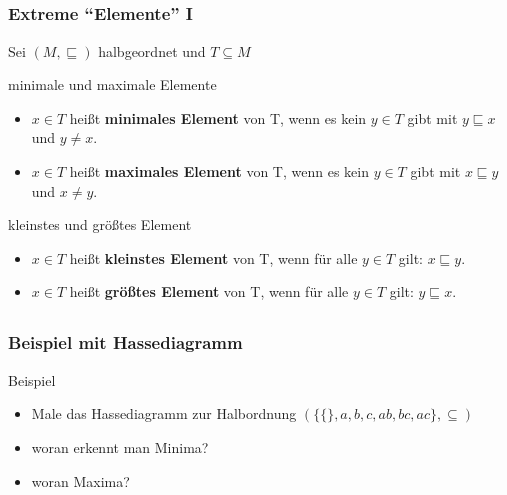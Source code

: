 \subsection*{}
\begin{frame}
  \frametitle{Extreme "`Elemente"' I}
  Sei $( M, \sqsubseteq )$ halbgeordnet und $T \subseteq M$ \pause
  \begin{block}{minimale und maximale Elemente}
    \begin{itemize}
    \item $x \in T$ heißt \textbf{minimales Element} von T, wenn es kein $y \in T$ gibt mit $y \sqsubseteq x$ und $y \neq x$. \pause
    \item $x \in T$ heißt \textbf{maximales Element} von T, wenn es kein $y \in T$ gibt mit $x \sqsubseteq y$ und $x \neq y$. \pause
    \end{itemize}
	\end{block}
	\begin{block}{kleinstes und größtes Element}
    \begin{itemize}
    \item $x \in T$ heißt \textbf{kleinstes Element} von T, wenn für alle $y \in T$ gilt: $x \sqsubseteq y$. \pause
    \item $x \in T$ heißt \textbf{größtes Element} von T, wenn für alle $y \in T$ gilt: $y \sqsubseteq x$.
    \end{itemize}
  \end{block}
\end{frame}

\subsection*{}
\begin{frame}
  \frametitle{Beispiel mit Hassediagramm}
  \begin{block}{Beispiel}
    \begin{itemize}
    \item Male das Hassediagramm zur Halbordnung $(\{ \{\}, a, b, c, ab, bc, ac\}, \subseteq)$ \pause
    \item woran erkennt man Minima? \pause
    \item woran Maxima?
    \end{itemize}
	\end{block}
\end{frame}

